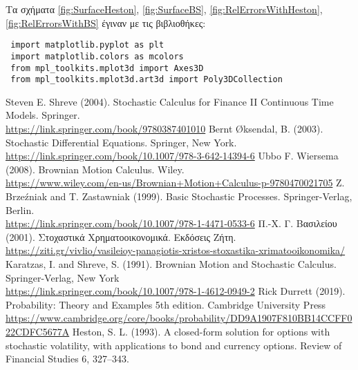\documentclass[12pt,a4paper,twoside,openany]{book}
\begin{document}
 	\vspace{4mm}
 	Τα σχήματα \eqref{fig:SurfaceHeston}, \eqref{fig:SurfaceBS}, \eqref{fig:RelErrorsWithHeston}, \eqref{fig:RelErrorsWithBS} έγιναν με τις βιβλιοθήκες:
 	\vspace{4mm}	
 \begin{lstlisting}
 import matplotlib.pyplot as plt
 import matplotlib.colors as mcolors
 from mpl_toolkits.mplot3d import Axes3D
 from mpl_toolkits.mplot3d.art3d import Poly3DCollection\end{lstlisting}
 	
 	
 	\newpage
 	\begin{thebibliography}{unsrt}
 			Steven E. Shreve (2004). Stochastic Calculus for Finance II Continuous Time Models. Springer.\\ \url{https://link.springer.com/book/9780387401010}
 			Bernt Øksendal, B. (2003). Stochastic Differential Equations. Springer, New York.\\ \url{https://link.springer.com/book/10.1007/978-3-642-14394-6}
 			Ubbo F. Wiersema (2008). Brownian Motion Calculus. Wiley.\\
 			\url{https://www.wiley.com/en-us/Brownian+Motion+Calculus-p-9780470021705}
 			Z. Brzeźniak and T. Zastawniak (1999). Basic Stochastic Processes.  Springer-Verlag, Berlin.\\
 			\url{https://link.springer.com/book/10.1007/978-1-4471-0533-6}
 			Π.-Χ. Γ. Βασιλείου (2001). Στοχαστικά Χρηματοοικονομικά. Εκδόσεις Ζήτη.\\ \url{https://ziti.gr/vivlio/vasileioy-panagiotis-xristos-stoxastika-xrimatooikonomika/} 
 			Karatzas, I. and Shreve, S. (1991). Brownian Motion and Stochastic Calculus. Springer-Verlag, New York \\ \url{https://link.springer.com/book/10.1007/978-1-4612-0949-2}
 			Rick Durrett (2019). Probability: Theory and Examples 5th edition. Cambridge University Press\\	\url{https://www.cambridge.org/core/books/probability/DD9A1907F810BB14CCFF022CDFC5677A}
 			Heston, S. L. (1993). A closed-form solution for options with stochastic volatility, with applications to bond and currency options. Review of Financial Studies 6, 327–343.\\

\end{thebibliography}
\end{document}
